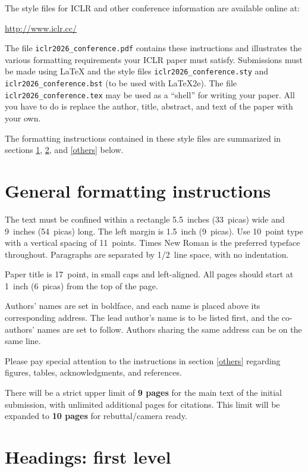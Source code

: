 \documentclass{article} %
\begin{document}
The style files for ICLR and other conference information are available online at:
\begin{center}
   \url{http://www.iclr.cc/}
\end{center}
The file \verb+iclr2026_conference.pdf+ contains these
instructions and illustrates the
various formatting requirements your ICLR paper must satisfy.
Submissions must be made using \LaTeX{} and the style files
\verb+iclr2026_conference.sty+ and \verb+iclr2026_conference.bst+ (to be used with \LaTeX{}2e). The file
\verb+iclr2026_conference.tex+ may be used as a ``shell'' for writing your paper. All you
have to do is replace the author, title, abstract, and text of the paper with
your own.

The formatting instructions contained in these style files are summarized in
sections \ref{gen_inst}, \ref{headings}, and \ref{others} below.

\section{General formatting instructions}
\label{gen_inst}

The text must be confined within a rectangle 5.5~inches (33~picas) wide and
9~inches (54~picas) long. The left margin is 1.5~inch (9~picas).
Use 10~point type with a vertical spacing of 11~points. Times New Roman is the
preferred typeface throughout. Paragraphs are separated by 1/2~line space,
with no indentation.

Paper title is 17~point, in small caps and left-aligned.
All pages should start at 1~inch (6~picas) from the top of the page.

Authors' names are
set in boldface, and each name is placed above its corresponding
address. The lead author's name is to be listed first, and
the co-authors' names are set to follow. Authors sharing the
same address can be on the same line.

Please pay special attention to the instructions in section \ref{others}
regarding figures, tables, acknowledgments, and references.


There will be a strict upper limit of \textbf{9 pages} for the main text of the initial submission, with unlimited additional pages for citations. This limit will be expanded to \textbf{10 pages} for rebuttal/camera ready.

\section{Headings: first level}
\label{headings}
\end{document}
